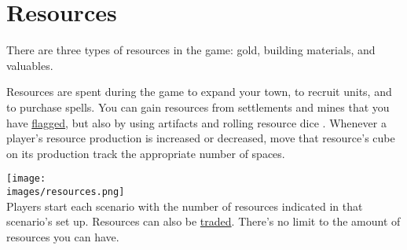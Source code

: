 \documentclass[12pt]{article}
\def\assets{assets}
\def\images{\assets/images}
\def\svgs{\assets/svgs}
\begin{document}
\clearpage
\section{Resources}
There are three types of resources in the game: gold, building materials, and valuables.

Resources are spent during the game to expand your town, to recruit units, and to purchase spells. You can gain resources from settlements and mines that you have \hyperlink{Categories}{flagged}, but also by using artifacts and rolling resource dice . Whenever a player's resource production is increased or decreased, move that resource's cube on its production track the appropriate number of spaces.\par
\texttt{[image: \\images/resources.png]}\\
Players start each scenario with the number of resources indicated in that scenario’s set up. Resources can also be \hyperlink{Trading}{traded}. There's no limit to the amount of resources you can have.
\end{document}
